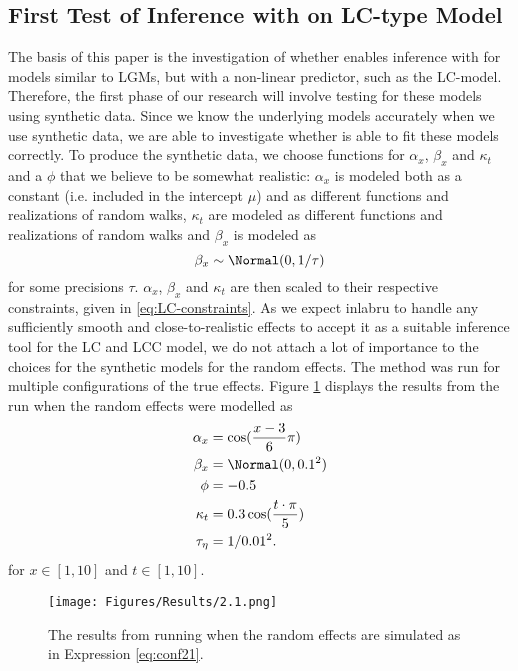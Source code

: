 \subsection{First Test of Inference with \inlabru on LC-type Model}
The basis of this paper is the investigation of whether \inlabru enables inference with \inla for models similar to LGMs, but with a non-linear predictor, such as the LC-model. Therefore, the first phase of our research will involve testing \inlabru for these models using synthetic data. Since we know the underlying models accurately when we use synthetic data, we are able to investigate whether \inlabru is able to fit these models correctly. 
\newline
\noindent To produce the synthetic data, we choose functions for $\alpha_x$, $\beta_x$ and $\kappa_t$ and a $\phi$ that we believe to be somewhat realistic: $\alpha_x$ is modeled both as a constant (i.e. included in the intercept $\mu$) and as different functions and realizations of random walks, $\kappa_t$ are modeled as different functions and realizations of random walks and $\beta_x$ is modeled as 
\begin{equation*}
    \beta_x \sim \Normal(0,1/\tau)
\end{equation*} 
for some precisions $\tau$. $\alpha_x$, $\beta_x$ and $\kappa_t$ are then scaled to their respective constraints, given in \ref{eq:LC-constraints}. As we expect inlabru to handle any sufficiently smooth and close-to-realistic effects to accept it as a suitable inference tool for the LC and LCC model, we do not attach a lot of importance to the choices for the synthetic models for the random effects. 
The \inlabru method was run for multiple configurations of the true effects. Figure \ref{fig:firstRun} displays the results from the run when the random effects were modelled as
\begin{equation}
    \begin{aligned}
    \alpha_x &= \cos(\frac{x-3}{6}\pi)\\
    \beta_x &= \Normal(0,0.1^2)\\
    \phi &= -0.5\\
    \kappa_t &= 0.3\cos(\frac{t\cdot \pi}{5})\\
    \tau_{\eta} &= 1/0.01^2.
    \end{aligned}
    \label{eq:conf21}
\end{equation}
for $x\in [1,10]$ and $t \in [1,10]$. 
\begin{figure}[h!]
    \centering
    \texttt{[image: Figures/Results/2.1.png]}
    \caption{The results from running \inlabru when the random effects are simulated as in Expression \ref{eq:conf21}.}
    \label{fig:firstRun}
\end{figure}
